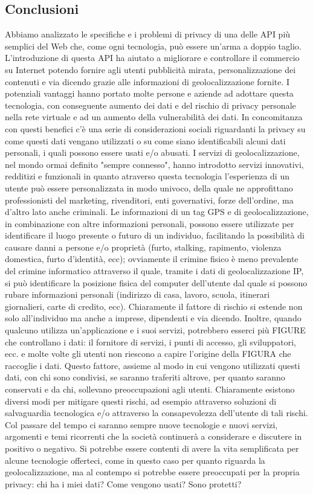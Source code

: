 \documentclass[11pt ,a4paper , twoside , openright ]{article}
\begin{document}
\subsection{Conclusioni}
Abbiamo analizzato le specifiche e i problemi di privacy di una delle API più semplici del Web che, come ogni tecnologia, può essere un'arma a doppio taglio. 
L'introduzione di questa API ha aiutato a migliorare e controllare il commercio su Internet potendo fornire agli utenti pubblicità mirata, personalizzazione dei contenuti e via dicendo grazie alle informazioni di geolocalizzazione fornite.
I potenziali vantaggi hanno portato molte persone e aziende ad adottare questa tecnologia, con conseguente aumento dei dati e del rischio di privacy personale nella rete virtuale e ad un aumento della vulnerabilità dei dati. 
In concomitanza con questi benefici c'è una serie di considerazioni sociali riguardanti la privacy su come questi dati vengano utilizzati o su come siano identificabili alcuni dati personali, i quali possono essere usati e/o abusati.
I servizi di geolocalizzazione, nel mondo ormai definito "sempre connesso", hanno introdotto servizi innovativi, redditizi e funzionali in quanto atraverso questa tecnologia l'esperienza di un utente può essere personalizzata in modo univoco, della quale ne approfittano professionisti del marketing, rivenditori, enti governativi, forze dell'ordine, ma d'altro lato anche criminali. 
Le informazioni di un tag GPS e di geolocalizzazione, in combinazione con altre informazioni personali, possono essere utilizzate per identificare il luogo presente o futuro di un individuo, facilitando la possibilità di causare danni a persone e/o proprietà (furto, stalking, rapimento, violenza domestica, furto d'identità, ecc); ovviamente il crimine fisico è meno prevalente del crimine informatico attraverso il quale, tramite i dati di geolocalizzazione IP, si può identificare la posizione fisica del computer dell'utente dal quale si possono rubare informazioni personali (indirizzo di casa, lavoro, scuola, itinerari giornalieri, carte di credito, ecc). Chiaramente il fattore di rischio si estende non solo all'individuo ma anche a imprese, dipendenti e via dicendo.
Inoltre, quando qualcuno utilizza un'applicazione e i suoi servizi, potrebbero esserci più FIGURE che controllano i dati: il fornitore di servizi, i punti di accesso, gli sviluppatori, ecc. e molte volte gli utenti non riescono a capire l'origine della FIGURA che raccoglie i dati. 
Questo fattore, assieme al modo in cui vengono utilizzati questi dati, con chi sono condivisi, se saranno traferiti altrove, per quanto saranno conservati e da chi, sollevano preoccupazioni agli utenti. 
Chiaramente esistono diversi modi per mitigare questi rischi, ad esempio attraverso soluzioni di salvaguardia tecnologica e/o attraverso la consapevolezza dell'utente di tali rischi.
\\
Col passare del tempo ci saranno sempre nuove tecnologie e nuovi servizi, argomenti e temi ricorrenti che la società continuerà a considerare e discutere in positivo o negativo.
Si potrebbe essere contenti di avere la vita semplificata per alcune tecnologie offerteci, come in questo caso per quanto riguarda la geolocalizzazione, ma al contempo si potrebbe essere preoccupati per la propria privacy: chi ha i miei dati? Come vengono usati? Sono protetti?
\newpage
\end{document}
